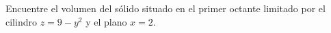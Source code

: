 \item Encuentre el volumen del sólido situado en el primer octante limitado por el cilindro $z = 9 - y^2$ y el plano $x = 2$.
